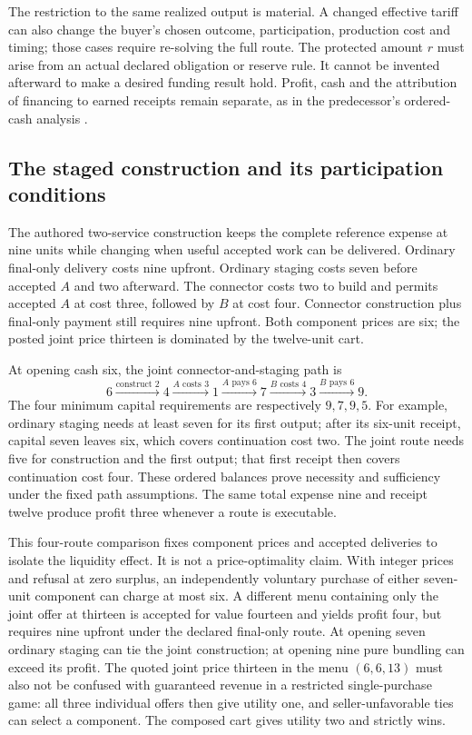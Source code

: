 The restriction to the same realized output is material. A changed effective tariff can also change the buyer's chosen outcome, participation, production cost and timing; those cases require re-solving the full route. The protected amount $r$ must arise from an actual declared obligation or reserve rule. It cannot be invented afterward to make a desired funding result hold. Profit, cash and the attribution of financing to earned receipts remain separate, as in the predecessor's ordered-cash analysis \cite{superalpha}.

\subsection{The staged construction and its participation conditions}\label{app:staging}

The authored two-service construction keeps the complete reference expense at nine units while changing when useful accepted work can be delivered. Ordinary final-only delivery costs nine upfront. Ordinary staging costs seven before accepted $A$ and two afterward. The connector costs two to build and permits accepted $A$ at cost three, followed by $B$ at cost four. Connector construction plus final-only payment still requires nine upfront. Both component prices are six; the posted joint price thirteen is dominated by the twelve-unit cart.

At opening cash six, the joint connector-and-staging path is
\[
6\xrightarrow{\text{construct }2}4
 \xrightarrow{A\text{ costs }3}1
 \xrightarrow{A\text{ pays }6}7
 \xrightarrow{B\text{ costs }4}3
 \xrightarrow{B\text{ pays }6}9.
\]
The four minimum capital requirements are respectively $9,7,9,5$. For example, ordinary staging needs at least seven for its first output; after its six-unit receipt, capital seven leaves six, which covers continuation cost two. The joint route needs five for construction and the first output; that first receipt then covers continuation cost four. These ordered balances prove necessity and sufficiency under the fixed path assumptions. The same total expense nine and receipt twelve produce profit three whenever a route is executable.

This four-route comparison fixes component prices and accepted deliveries to isolate the liquidity effect. It is not a price-optimality claim. With integer prices and refusal at zero surplus, an independently voluntary purchase of either seven-unit component can charge at most six. A different menu containing only the joint offer at thirteen is accepted for value fourteen and yields profit four, but requires nine upfront under the declared final-only route. At opening seven ordinary staging can tie the joint construction; at opening nine pure bundling can exceed its profit. The quoted joint price thirteen in the menu $(6,6,13)$ must also not be confused with guaranteed revenue in a restricted single-purchase game: all three individual offers then give utility one, and seller-unfavorable ties can select a component. The composed cart gives utility two and strictly wins.

